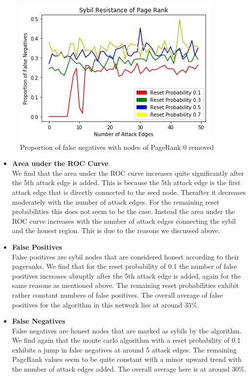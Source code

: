 \documentclass[twocolumn]{article}
\theoremstyle{definition}
\theoremstyle{theorem}
\begin{document}
\begin{figure}
\includegraphics[scale=0.6]{ROCArea6}
\caption{Proportion of false negatives with nodes of PageRank 0 removed}
\label{fig:ROCArea6}
\end{figure}

\begin{itemize}
\item {\bf Area under the ROC Curve} \\
We find that the area under the ROC curve increases quite significantly after the 5th attack edge is added. This is because the 5th attack edge is the first attack edge that is directly connected to the seed node. Therafter it decreases moderately with the number of attack edges. For the remaining reset probabilities this does not seem to be the case. Instead the area under the ROC curve increases with the number of attack edges connecting the sybil and the honest region. This is due to the reasons we discussed above.

\item {\bf False Positives} \\
False positives are sybil nodes that are considered honest according to their pageranks. We find that for the reset probability of 0.1 the number of false positives increases abruptly after the 5th attack edge is added, again for the same reasons as mentioned above. The remaining reset probabilities exhibit rather constant numbers of false positives. The overall average of false positives for the algorithm in this network lies at around $35\%$.

\item {\bf False Negatives} \\
False negatives are honest nodes that are marked as sybils by the algorithm. We find again that the monte carlo algorithm with a reset probability of 0.1 exhibits a jump in false negatives at around 5 attack edges. The remaining PageRank values seem to be quite constant with a minor upward trend with the number of attack edges added. The overall average here is at around $30\%$.
\end{itemize}
\end{document}
